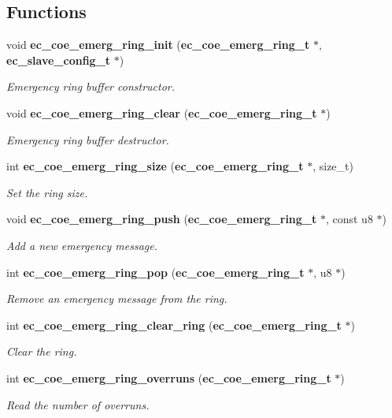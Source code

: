 \subsection*{Functions}
\begin{DoxyCompactItemize}
\item 
void {\bf ec\-\_\-coe\-\_\-emerg\-\_\-ring\-\_\-init} ({\bf ec\-\_\-coe\-\_\-emerg\-\_\-ring\-\_\-t} $\ast$, {\bf ec\-\_\-slave\-\_\-config\-\_\-t} $\ast$)\label{coe__emerg__ring_8h_a29d0aa3bea8dc5911ec6e90e43220fcf}

\begin{DoxyCompactList}\small\item\em Emergency ring buffer constructor. \end{DoxyCompactList}\item 
void {\bf ec\-\_\-coe\-\_\-emerg\-\_\-ring\-\_\-clear} ({\bf ec\-\_\-coe\-\_\-emerg\-\_\-ring\-\_\-t} $\ast$)\label{coe__emerg__ring_8h_aa2cc2988730a5be5b4501447bee6ccac}

\begin{DoxyCompactList}\small\item\em Emergency ring buffer destructor. \end{DoxyCompactList}\item 
int {\bf ec\-\_\-coe\-\_\-emerg\-\_\-ring\-\_\-size} ({\bf ec\-\_\-coe\-\_\-emerg\-\_\-ring\-\_\-t} $\ast$, size\-\_\-t)
\begin{DoxyCompactList}\small\item\em Set the ring size. \end{DoxyCompactList}\item 
void {\bf ec\-\_\-coe\-\_\-emerg\-\_\-ring\-\_\-push} ({\bf ec\-\_\-coe\-\_\-emerg\-\_\-ring\-\_\-t} $\ast$, const u8 $\ast$)\label{coe__emerg__ring_8h_a7dc4cc68ee9867298393aef837b95dce}

\begin{DoxyCompactList}\small\item\em Add a new emergency message. \end{DoxyCompactList}\item 
int {\bf ec\-\_\-coe\-\_\-emerg\-\_\-ring\-\_\-pop} ({\bf ec\-\_\-coe\-\_\-emerg\-\_\-ring\-\_\-t} $\ast$, u8 $\ast$)
\begin{DoxyCompactList}\small\item\em Remove an emergency message from the ring. \end{DoxyCompactList}\item 
int {\bf ec\-\_\-coe\-\_\-emerg\-\_\-ring\-\_\-clear\-\_\-ring} ({\bf ec\-\_\-coe\-\_\-emerg\-\_\-ring\-\_\-t} $\ast$)
\begin{DoxyCompactList}\small\item\em Clear the ring. \end{DoxyCompactList}\item 
int {\bf ec\-\_\-coe\-\_\-emerg\-\_\-ring\-\_\-overruns} ({\bf ec\-\_\-coe\-\_\-emerg\-\_\-ring\-\_\-t} $\ast$)
\begin{DoxyCompactList}\small\item\em Read the number of overruns. \end{DoxyCompactList}\end{DoxyCompactItemize}


